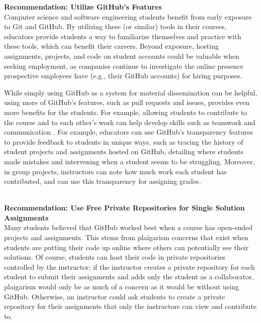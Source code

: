 \textbf{Recommendation: Utilize GitHub's Features} \\
Computer science and software engineering students benefit from early exposure to Git and GitHub. By utilizing these (or similar) tools in their courses, educators provide students a way to familiarize themselves and practice with these tools, which can benefit their careers. Beyond exposure, hosting assignments, projects, and code on student accounts could be valuable when seeking employment, as companies continue to investigate the online presence prospective employees have (e.g., their GitHub accounts) for hiring purposes.

While simply using GitHub as a system for material dissemination can be helpful, using more of GitHub's features, such as pull requests and issues, provides even more benefits for the students. For example, allowing students to contribute to the course and to each other's work can help develop skills such as teamwork and communication \cite{hamer2006some}. For example, educators can use GitHub's transparency features to provide feedback to students in unique ways, such as tracing the history of student projects and assignments hosted on GitHub, detailing where students made mistakes and intervening when a student seems to be struggling. Moreover, in group projects, instructors can note how much work each student has contributed, and can use this transparency for assigning grades.

\\


\textbf{Recommendation: Use Free Private Repositories for Single Solution Assignments} \\
Many students believed that GitHub worked best when a course has open-ended projects and assignments. This stems from plaigarism concerns that exist when students are putting their code up online where others can potentially see their solutions. Of course, students can host their code in private repositories controlled by the instructor; if the instructor creates a private repository for each student to submit their assignments and adds only the student as a collaborator, plaigarism would only be as much of a concern as it would be without using GitHub. Otherwise, an instructor could ask students to create a private repository for their assignments that only the instructors can view and contribute to.

